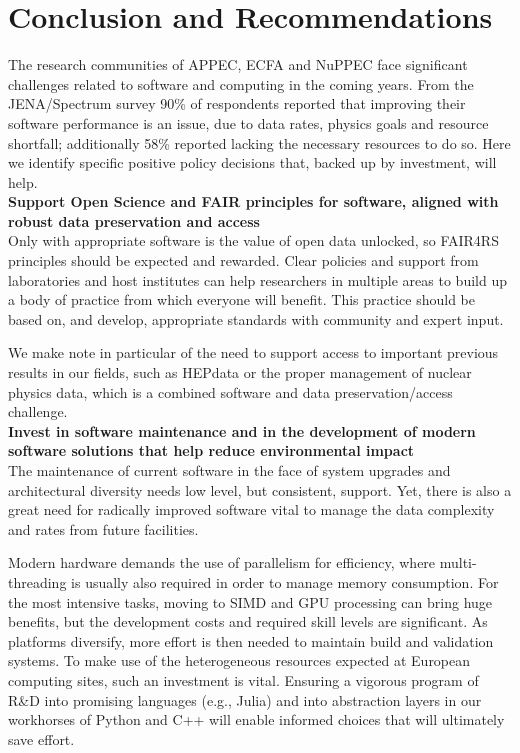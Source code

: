 \section{Conclusion and Recommendations}

The research communities of APPEC, ECFA and NuPPEC face significant challenges related to software and computing in the coming years. From the JENA/Spectrum survey 90\% of respondents reported that improving their software performance is an issue, due to data rates, physics goals and resource shortfall; additionally 58\% reported lacking the necessary resources to do so. Here we identify specific positive policy decisions that, backed up by investment, will help.
\\

{\bf Support Open Science and FAIR principles for software, aligned with robust data preservation and access}\\

Only with appropriate software is the value of open data unlocked, so FAIR4RS principles should be expected and rewarded. Clear policies and support from laboratories and host institutes can help researchers in multiple areas to build up a body of practice from which everyone will benefit. This practice should be based on, and develop, appropriate standards with community and expert input.

We make note in particular of the need to support access to important previous results in our fields, such as HEPdata or the proper management of nuclear physics data, which is a combined software and data preservation/access challenge.
\\

{\bf Invest in software maintenance and in the development of modern software solutions that help reduce environmental impact}\\


The maintenance of current software in the face of system upgrades and architectural diversity needs low level, but consistent, support. Yet, there is also a great need for radically improved software vital to manage the data complexity and rates from future facilities.

Modern hardware demands the use of parallelism for efficiency, where multi-threading is usually also required in order to manage memory consumption. For the most intensive tasks, moving to SIMD and GPU processing can bring huge benefits, but the development costs and required skill levels are significant. As platforms diversify, more effort is then needed to maintain build and validation systems. To make use of the heterogeneous resources expected at European computing sites, such an investment is vital. Ensuring a vigorous program of R\&D into promising languages (e.g., Julia) and into abstraction layers in our workhorses of Python and C++ will enable informed choices that will ultimately save effort.

